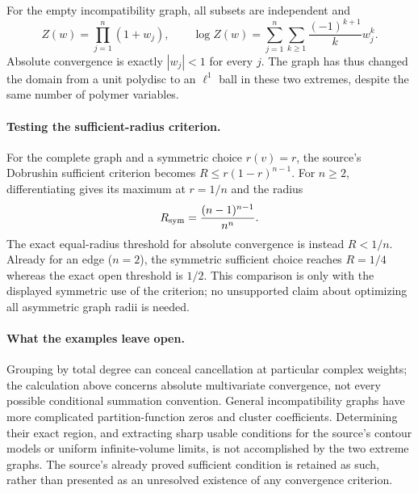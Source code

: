 \documentclass[11pt]{article}
\begin{document}
For the empty incompatibility graph, all subsets are independent and
\[
 Z(w)=\prod_{j=1}^n(1+w_j),\qquad
 \log Z(w)=\sum_{j=1}^n\sum_{k\geq1}
                 \frac{(-1)^{k+1}}k w_j^k.
\]
Absolute convergence is exactly $|w_j|<1$ for every $j$. The graph has thus changed the domain from a unit polydisc to an $\ell^1$ ball in these two extremes, despite the same number of polymer variables.

\paragraph{Testing the sufficient-radius criterion.}
For the complete graph and a symmetric choice $r(v)=r$, the source's Dobrushin sufficient criterion becomes
$R\leq r(1-r)^{n-1}$.
For $n\geq2$, differentiating gives its maximum at $r=1/n$ and the radius
\[
 R_{\rm sym}=\frac{(n-1)^{n-1}}{n^n}.
\]
The exact equal-radius threshold for absolute convergence is instead $R<1/n$. Already for an edge ($n=2$), the symmetric sufficient choice reaches $R=1/4$ whereas the exact open threshold is $1/2$. This comparison is only with the displayed symmetric use of the criterion; no unsupported claim about optimizing all asymmetric graph radii is needed.

\paragraph{What the examples leave open.}
Grouping by total degree can conceal cancellation at particular complex weights; the calculation above concerns absolute multivariate convergence, not every possible conditional summation convention. General incompatibility graphs have more complicated partition-function zeros and cluster coefficients. Determining their exact region, and extracting sharp usable conditions for the source's contour models or uniform infinite-volume limits, is not accomplished by the two extreme graphs. The source's already proved sufficient condition is retained as such, rather than presented as an unresolved existence of any convergence criterion.
\end{document}
